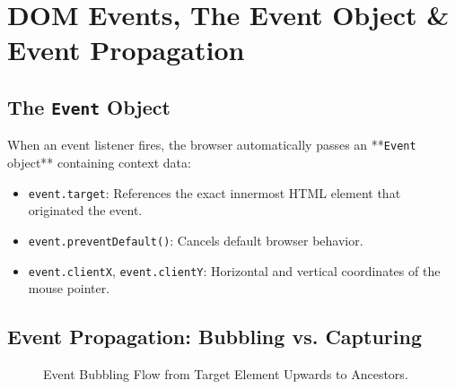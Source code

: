 \section{DOM Events, The Event Object \& Event Propagation}

\subsection{The \texttt{Event} Object}
When an event listener fires, the browser automatically passes an **\texttt{Event} object** containing context data:
\begin{itemize}[leftmargin=1.5em]
    \item \texttt{event.target}: References the exact innermost HTML element that originated the event.
    \item \texttt{event.preventDefault()}: Cancels default browser behavior.
    \item \texttt{event.clientX}, \texttt{event.clientY}: Horizontal and vertical coordinates of the mouse pointer.
\end{itemize}

\subsection{Event Propagation: Bubbling vs. Capturing}

\begin{figure}[htbp]
\centering
{}
\caption{Event Bubbling Flow from Target Element Upwards to Ancestors.}
\label{fig:event-bubbling}
\end{figure}

